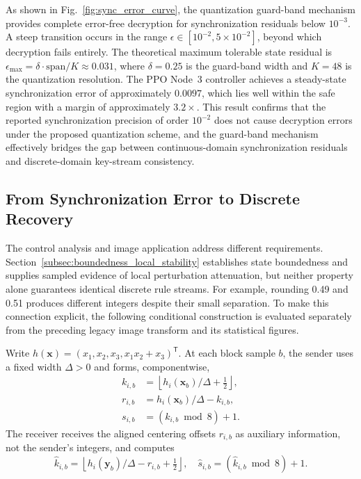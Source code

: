 \documentclass[a4paper,fleqn]{cas-sc}
\theoremstyle{plain}
\theoremstyle{definition}
\begin{document}
As shown in Fig.~\ref{fig:sync_error_curve}, the quantization guard-band mechanism provides complete error-free decryption for synchronization residuals below $10^{-3}$. A steep transition occurs in the range $\epsilon \in [10^{-2}, 5 \times 10^{-2}]$, beyond which decryption fails entirely. The theoretical maximum tolerable state residual is $\epsilon_{\max} = \delta \cdot \mathrm{span} / K \approx 0.031$, where $\delta = 0.25$ is the guard-band width and $K = 48$ is the quantization resolution. The PPO Node~3 controller achieves a steady-state synchronization error of approximately $0.0097$, which lies well within the safe region with a margin of approximately $3.2\times$. This result confirms that the reported synchronization precision of order $10^{-2}$ does not cause decryption errors under the proposed quantization scheme, and the guard-band mechanism effectively bridges the gap between continuous-domain synchronization residuals and discrete-domain key-stream consistency.


\FloatBarrier
\subsection{From Synchronization Error to Discrete Recovery}
\label{subsec:sync_application_bridge}

The control analysis and image application address different requirements. Section~\ref{subsec:boundedness_local_stability} establishes state boundedness and supplies sampled evidence of local perturbation attenuation, but neither property alone guarantees identical discrete rule streams. For example, rounding 0.49 and 0.51 produces different integers despite their small separation. To make this connection explicit, the following conditional construction is evaluated separately from the preceding legacy image transform and its statistical figures.

Write $h(\mathbf{x})=(x_1,x_2,x_3,x_1x_2+x_3)^{\mathsf T}$. At each block sample $b$, the sender uses a fixed width $\Delta>0$ and forms, componentwise,
\begin{equation}
\begin{aligned}
 k_{i,b}&=\left\lfloor h_i(\mathbf{x}_b)/\Delta+\tfrac12\right\rfloor,\\
 r_{i,b}&=h_i(\mathbf{x}_b)/\Delta-k_{i,b},\\
 s_{i,b}&=(k_{i,b}\bmod8)+1.
\end{aligned}
\label{eq:bridge_sender}
\end{equation}
The receiver receives the aligned centering offsets $r_{i,b}$ as auxiliary information, not the sender's integers, and computes
\begin{equation}
\widehat k_{i,b}=\left\lfloor h_i(\mathbf{y}_b)/\Delta-r_{i,b}+\tfrac12\right\rfloor,
\quad \widehat s_{i,b}=(\widehat k_{i,b}\bmod8)+1.
\label{eq:bridge_receiver}
\end{equation}
\end{document}
